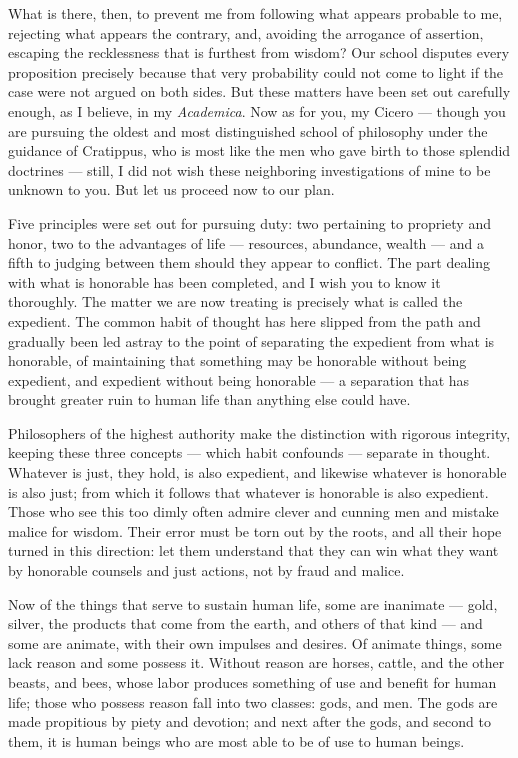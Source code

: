  What is there, then, to prevent me from following what appears probable to me, rejecting what appears the contrary, and, avoiding the arrogance of assertion, escaping the recklessness that is furthest from wisdom? Our school disputes every proposition precisely because that very probability could not come to light if the case were not argued on both sides. But these matters have been set out carefully enough, as I believe, in my \textit{Academica}. Now as for you, my Cicero — though you are pursuing the oldest and most distinguished school of philosophy under the guidance of Cratippus, who is most like the men who gave birth to those splendid doctrines — still, I did not wish these neighboring investigations of mine to be unknown to you. But let us proceed now to our plan.

 Five principles were set out for pursuing duty: two pertaining to propriety and honor, two to the advantages of life — resources, abundance, wealth — and a fifth to judging between them should they appear to conflict. The part dealing with what is honorable has been completed, and I wish you to know it thoroughly. The matter we are now treating is precisely what is called the expedient. The common habit of thought has here slipped from the path and gradually been led astray to the point of separating the expedient from what is honorable, of maintaining that something may be honorable without being expedient, and expedient without being honorable — a separation that has brought greater ruin to human life than anything else could have.

 Philosophers of the highest authority make the distinction with rigorous integrity, keeping these three concepts — which habit confounds — separate in thought. Whatever is just, they hold, is also expedient, and likewise whatever is honorable is also just; from which it follows that whatever is honorable is also expedient. Those who see this too dimly often admire clever and cunning men and mistake malice for wisdom. Their error must be torn out by the roots, and all their hope turned in this direction: let them understand that they can win what they want by honorable counsels and just actions, not by fraud and malice.

 Now of the things that serve to sustain human life, some are inanimate — gold, silver, the products that come from the earth, and others of that kind — and some are animate, with their own impulses and desires. Of animate things, some lack reason and some possess it. Without reason are horses, cattle, and the other beasts, and bees, whose labor produces something of use and benefit for human life; those who possess reason fall into two classes: gods, and men. The gods are made propitious by piety and devotion; and next after the gods, and second to them, it is human beings who are most able to be of use to human beings.

